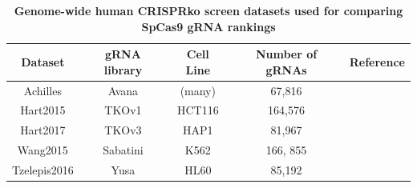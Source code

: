\documentclass[pdftex,english,10pt]{article}
\begin{document}
{%
\begin{table}[]
\centering 
\begin{tabular}{c|c|c|c|c}
Dataset   & gRNA library  & Cell Line & Number of gRNAs  & Reference \\ \hline
Achilles  & Avana   & (many)   & 67,816  &       \citet{ceres}    \\
Hart2015 & TKOv1  &  HCT116     & 164,576 &         \citet{toronto1}       \\
Hart2017 & TKOv3    & HAP1        & 81,967 &     \citet{toronto3}         \\
Wang2015 & Sabatini & K562      &166, 855 &          \citet{sabatini}     \\
Tzelepis2016  &     Yusa     &  HL60     &   85,192 &         \citet{yusa}  
\end{tabular}
\caption{\textbf{Genome-wide human CRISPRko screen datasets used for comparing SpCas9 gRNA rankings}}
\label{tab:screens}
\end{table}




}
\end{document}
